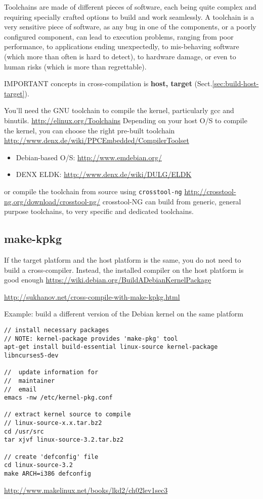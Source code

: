 Toolchains are made of different pieces of
software, each being quite complex and requiring specially crafted options to
build and work seamlessly.
A toolchain is a very sensitive piece of software, as any bug in one of the
components, or a poorly configured component, can lead to execution problems,
ranging from poor performance, to applications ending unexpectedly, to
mis-behaving software (which more than often is hard to detect), to hardware
damage, or even to human risks (which is more than regrettable).

IMPORTANT concepts in cross-compilation is {\bf host, target}
(Sect.\ref{sec:build-host-target}).

You'll need the GNU toolchain to compile the kernel, particularly gcc and binutils.
\url{http://elinux.org/Toolchains}
Depending on your host O/S to compile the kernel, you can choose the right pre-built toolchain
\url{http://www.denx.de/wiki/PPCEmbedded/CompilerToolset}
\begin{itemize}
  \item Debian-based O/S: \url{http://www.emdebian.org/}
  \item DENX ELDK: \url{http://www.denx.de/wiki/DULG/ELDK}
\end{itemize}

or compile the toolchain from source using \verb!crosstool-ng!
\url{http://crosstool-ng.org/download/crosstool-ng/}
crosstool-NG can build from generic, general purpose toolchains, to very
specific and dedicated toolchains.


\subsection{make-kpkg}
\label{sec:make-kpkg}

If the target platform and the host platform is the same, you do not need to
build a cross-compiler. Instead, the installed compiler on the host platform is
good enough
\url{https://wiki.debian.org/BuildADebianKernelPackage}

\url{http://sukhanov.net/cross-compile-with-make-kpkg.html}

Example: build a different version of the Debian kernel on the same platform
\begin{verbatim}
// install necessary packages
// NOTE: kernel-package provides 'make-pkg' tool
apt-get install build-essential linux-source kernel-package libncurses5-dev

//  update information for
// 	maintainer
//  email
emacs -nw /etc/kernel-pkg.conf

// extract kernel source to compile
// linux-source-x.x.tar.bz2
cd /usr/src
tar xjvf linux-source-3.2.tar.bz2

// create 'defconfig' file
cd linux-source-3.2
make ARCH=i386 defconfig
\end{verbatim}
\url{http://www.makelinux.net/books/lkd2/ch02lev1sec3}

